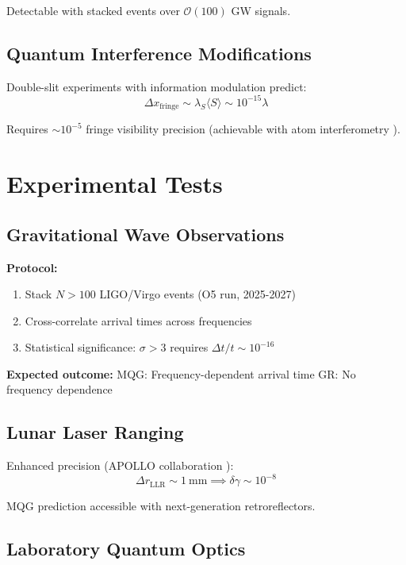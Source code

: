 \documentclass[twocolumn,prd,superscriptaddress,nofootinbib]{revtex4-2}
\newcommand{\sfield}{S}
\begin{document}
Detectable with stacked events over $\mathcal{O}(100)$ GW signals.

\subsection{Quantum Interference Modifications}

Double-slit experiments with information modulation predict:
\begin{equation}
\Delta x_{\text{fringe}} \sim \lambda_{\sfield} \langle \sfield \rangle \sim 10^{-15} \lambda
\end{equation}

Requires $\sim 10^{-5}$ fringe visibility precision (achievable with atom interferometry \cite{Cronin2009}).

\section{Experimental Tests}

\subsection{Gravitational Wave Observations}

\textbf{Protocol:}
\begin{enumerate}
\item Stack $N > 100$ LIGO/Virgo events (O5 run, 2025-2027)
\item Cross-correlate arrival times across frequencies
\item Statistical significance: $\sigma > 3$ requires $\Delta t/t \sim 10^{-16}$
\end{enumerate}

\textbf{Expected outcome:}
MQG: Frequency-dependent arrival time  
GR: No frequency dependence

\subsection{Lunar Laser Ranging}

Enhanced precision (APOLLO collaboration \cite{Murphy2008}):
\begin{equation}
\Delta r_{\text{LLR}} \sim 1~\text{mm} \implies \delta\gamma \sim 10^{-8}
\end{equation}

MQG prediction accessible with next-generation retroreflectors.

\subsection{Laboratory Quantum Optics}
\end{document}
